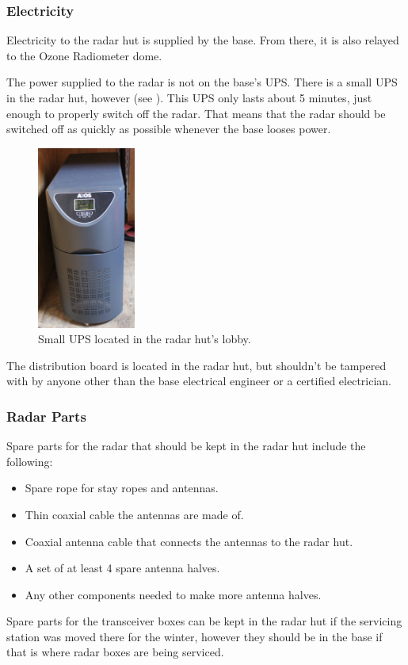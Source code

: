 \subsubsection{Electricity}
Electricity to the radar hut is supplied by the base. From there, it is also relayed to the Ozone Radiometer dome.
\par
The power supplied to the radar is not on the base's UPS. There is a small UPS in the radar hut, however (see ). This UPS only lasts about 5 minutes, just enough to properly switch off the radar. That means that the radar should be switched off as quickly as possible whenever the base looses power.
\begin{figure}[H]
	\centering
	\includegraphics[height=6cm]{images/infrastructure/ups.jpg}
	\caption{Small UPS located in the radar hut's lobby.}
	\label{fig:infra_ups}
\end{figure}
\par
The distribution board is located in the radar hut, but shouldn't be tampered with by anyone other than the base electrical engineer or a certified electrician.

\subsubsection{Radar Parts}
Spare parts for the radar that should be kept in the radar hut include the following:
\begin{itemize}
	\item Spare rope for stay ropes and antennas.
	\item Thin coaxial cable the antennas are made of.
	\item Coaxial antenna cable that connects the antennas to the radar hut.
	\item A set of at least 4 spare antenna halves.
	\item Any other components needed to make more antenna halves.
\end{itemize}
\par
Spare parts for the transceiver boxes can be kept in the radar hut if the servicing station was moved there for the winter, however they should be in the base if that is where radar boxes are being serviced.

